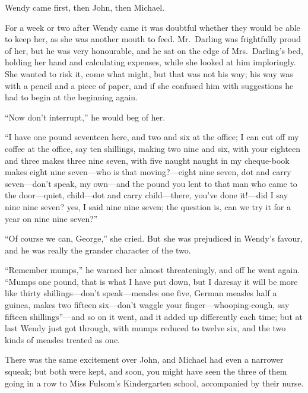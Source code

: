 Wendy came first, then John, then Michael.

For a week or two after Wendy came it was doubtful whether they would be able to
keep her, as she was another mouth to feed. Mr.\ Darling was frightfully proud
of her, but he was very honourable, and he sat on the edge of Mrs.\ Darling's
bed, holding her hand and calculating expenses, while she looked at him
imploringly. She wanted to risk it, come what might, but that was not his way;
his way was with a pencil and a piece of paper, and if she confused him with
suggestions he had to begin at the beginning again.

``Now don't interrupt,'' he would beg of her.

``I have one pound seventeen here, and two and six at the office; I can cut off
my coffee at the office, say ten shillings, making two nine and six, with your
eighteen and three makes three nine seven, with five naught naught in my
cheque-book makes eight nine seven---who is that moving?---eight nine seven, dot
and carry seven---don't speak, my own---and the pound you lent to that man who
came to the door---quiet, child---dot and carry child---there, you've done
it!---did I say nine nine seven? yes, I said nine nine seven; the question is,
can we try it for a year on nine nine seven?''

``Of course we can, George,'' she cried. But she was prejudiced in Wendy's
favour, and he was really the grander character of the two.

``Remember mumps,'' he warned her almost threateningly, and off he went again.
``Mumps one pound, that is what I have put down, but I daresay it will be more
like thirty shillings---don't speak---measles one five, German measles half a
guinea, makes two fifteen six---don't waggle your finger---whooping-cough, say
fifteen shillings''---and so on it went, and it added up differently each time;
but at last Wendy just got through, with mumps reduced to twelve six, and the
two kinds of measles treated as one.

There was the same excitement over John, and Michael had even a narrower squeak;
but both were kept, and soon, you might have seen the three of them going in a
row to Miss Fulsom's Kindergarten school, accompanied by their nurse.

